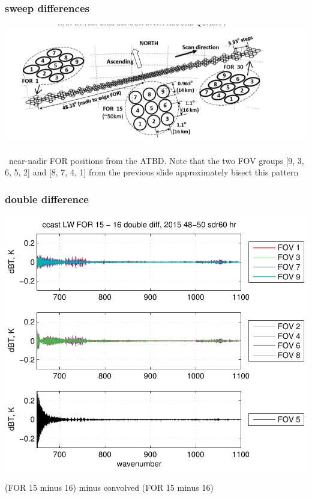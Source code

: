 \documentclass[11pt]{beamer}
\begin{document}
\begin{frame}
\frametitle{sweep differences}
\begin{center}
  \includegraphics[scale=0.6]{figures/cris_FOR.png}
\end{center}
\cris\ near-nadir FOR positions from the ATBD.  Note that the two
FOV groups [9, 3, 6, 5, 2] and [8, 7, 4, 1] from the previous slide
approximately bisect this pattern
\end{frame}
\begin{frame}
\frametitle{double difference}
\begin{center}
  \includegraphics[scale=0.6]{figures/ccast_LW_sfil_2015_48-50_sdr60_hr.pdf}

(FOR 15 minus 16) minus convolved (FOR 15 minus 16)

\end{center}
\end{frame}
\end{document}
